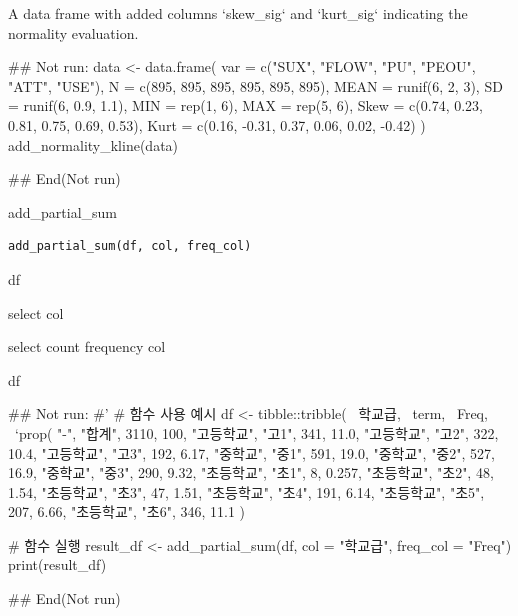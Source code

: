 \documentclass[a4paper]{book}
\begin{document}
%
\begin{Value}
A data frame with added columns `skew\_sig` and `kurt\_sig` indicating the normality evaluation.
\end{Value}
%
\begin{Examples}
\begin{ExampleCode}
## Not run: 
data <- data.frame(
  var = c("SUX", "FLOW", "PU", "PEOU", "ATT", "USE"),
  N = c(895, 895, 895, 895, 895, 895),
  MEAN = runif(6, 2, 3),
  SD = runif(6, 0.9, 1.1),
  MIN = rep(1, 6),
  MAX = rep(5, 6),
  Skew = c(0.74, 0.23, 0.81, 0.75, 0.69, 0.53),
  Kurt = c(0.16, -0.31, 0.37, 0.06, 0.02, -0.42)
)
add_normality_kline(data)

## End(Not run)
\end{ExampleCode}
\end{Examples}
%
\begin{Description}
add\_partial\_sum
\end{Description}
%
\begin{Usage}
\begin{verbatim}
add_partial_sum(df, col, freq_col)
\end{verbatim}
\end{Usage}
%
\begin{Arguments}
\begin{ldescription}
\item[\code{df}] df

\item[\code{col}] select col

\item[\code{freq\_col}] select count frequency col
\end{ldescription}
\end{Arguments}
%
\begin{Value}
df
\end{Value}
%
\begin{Examples}
\begin{ExampleCode}
## Not run: 
#'
# 함수 사용 예시
df <- tibble::tribble(
  ~학교급, ~term, ~Freq, ~`prop(%
  "-", "합계", 3110, 100,
  "고등학교", "고1", 341, 11.0,
  "고등학교", "고2", 322, 10.4,
  "고등학교", "고3", 192, 6.17,
  "중학교", "중1", 591, 19.0,
  "중학교", "중2", 527, 16.9,
  "중학교", "중3", 290, 9.32,
  "초등학교", "초1", 8, 0.257,
  "초등학교", "초2", 48, 1.54,
  "초등학교", "초3", 47, 1.51,
  "초등학교", "초4", 191, 6.14,
  "초등학교", "초5", 207, 6.66,
  "초등학교", "초6", 346, 11.1
)

# 함수 실행
result_df <- add_partial_sum(df, col = "학교급", freq_col = "Freq")
print(result_df)

## End(Not run)

\end{ExampleCode}
\end{Examples}
\end{document}
